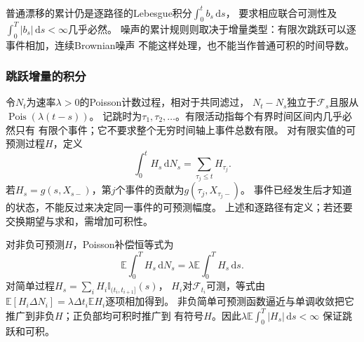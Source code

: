普通漂移的累计仍是逐路径的Lebesgue积分$\int_0^t b_s\,\mathrm ds$，
要求相应联合可测性及$\int_0^T|b_s|\,\mathrm ds<\infty$几乎必然。
噪声的累计规则则取决于增量类型：有限次跳跃可以逐事件相加，连续Brownian噪声
不能这样处理，也不能当作普通可积的时间导数。

\subsubsection{跳跃增量的积分}
\label{sec:action-state-poisson-integral}

令$N_t$为速率$\lambda>0$的Poisson计数过程，相对于共同滤过，
$N_t-N_s$独立于$\mathcal F_s$且服从$\operatorname{Pois}(\lambda(t-s))$。
记跳时为$\tau_1,\tau_2,\ldots$。有限活动指每个有界时间区间内几乎必然只有
有限个事件；它不要求整个无穷时间轴上事件总数有限。
对有限实值的可预测过程$H$，定义
\begin{equation}
  \int_0^t H_s\,\mathrm dN_s
    =\sum_{\tau_j\leq t}H_{\tau_j}.
  \label{eq:action-state-poisson-integral}
\end{equation}
若$H_s=g(s,X_{s-})$，第$j$个事件的贡献为$g(\tau_j,X_{\tau_j-})$。
事件已经发生后才知道的状态，不能反过来决定同一事件的可预测幅度。
上述和逐路径有定义；若还要交换期望与求和，需增加可积性。

对非负可预测$H$，Poisson补偿恒等式为
\[
  \mathbb E\int_0^T H_s\,\mathrm dN_s
       =\lambda\mathbb E\int_0^T H_s\,\mathrm ds.
\]
对简单过程$H_s=\sum_iH_i\mathbb I_{(t_i,t_{i+1}]}(s)$，
$H_i$对$\mathcal F_{t_i}$可测，等式由
$\mathbb E[H_i\Delta N_i]=\lambda\Delta t_i\mathbb E H_i$逐项相加得到。
非负简单可预测函数逼近与单调收敛把它推广到非负$H$；正负部均可积时推广到
有符号$H$。因此$\lambda\mathbb E\int_0^T|H_s|\,\mathrm ds<\infty$
保证跳跃和可积。

